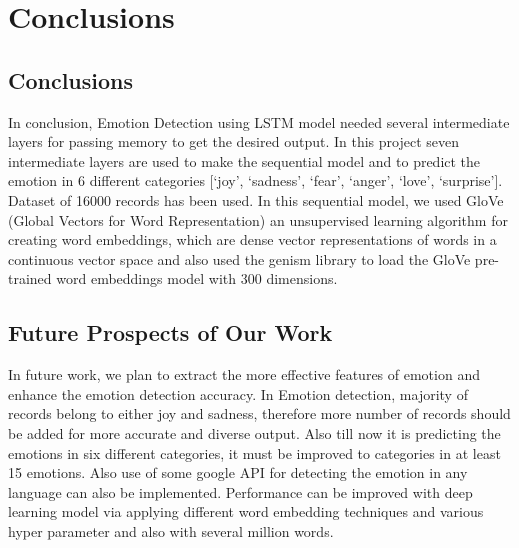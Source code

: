 \chapter{Conclusions}\label{ch:conclusion}

\section{Conclusions}
In conclusion, Emotion Detection using LSTM model needed several intermediate layers for passing memory to get the desired output. In this project seven intermediate
layers are used to make the sequential model and to predict the emotion in 6 different categories [‘joy’, ‘sadness’, ‘fear’, ‘anger’, ‘love’, ‘surprise’]. Dataset of 16000 records has been used. In this sequential model, we used GloVe (Global Vectors for Word Representation) an unsupervised learning algorithm for creating word embeddings, which are dense vector representations of words in a continuous vector space and also used the genism library to load the GloVe pre-trained word embeddings model with 300 dimensions.

\section{Future Prospects of Our Work}
In future work, we plan to extract the more effective features of emotion and enhance the emotion detection accuracy. In Emotion detection, majority of records belong to either joy and sadness, therefore more number of records should be added for more accurate and diverse output. Also till now it is predicting the emotions in six different categories, it must be improved to categories in at least 15 emotions. Also use of some google API for detecting the emotion in any language can also be implemented. Performance can be improved with deep learning model via applying different word embedding techniques and various hyper parameter and also with several million words.
